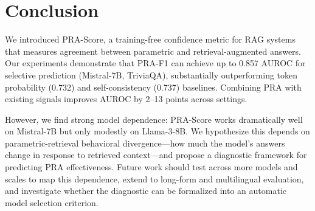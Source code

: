 \documentclass{article}
\begin{document}
\section{Conclusion}

We introduced PRA-Score, a training-free confidence metric for RAG systems that measures agreement between parametric and retrieval-augmented answers. Our experiments demonstrate that PRA-F1 can achieve up to 0.857 AUROC for selective prediction (Mistral-7B, TriviaQA), substantially outperforming token probability (0.732) and self-consistency (0.737) baselines. Combining PRA with existing signals improves AUROC by 2--13 points across settings.

However, we find strong model dependence: PRA-Score works dramatically well on Mistral-7B but only modestly on Llama-3-8B. We hypothesize this depends on parametric-retrieval behavioral divergence---how much the model's answers change in response to retrieved context---and propose a diagnostic framework for predicting PRA effectiveness. Future work should test across more models and scales to map this dependence, extend to long-form and multilingual evaluation, and investigate whether the diagnostic can be formalized into an automatic model selection criterion.



\end{document}
